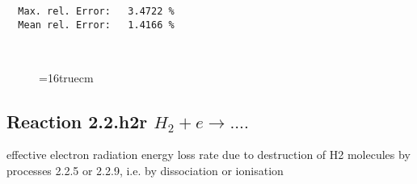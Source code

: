 \documentclass[12pt,dvipdfmx]{article}
\begin{document}
\begin{small}
\begin{verbatim}
  Max. rel. Error:   3.4722 %
  Mean rel. Error:   1.4166 %



\end{verbatim}\end{small}
\begin{figure} \label{2.2.h2c}
\epsfxsize=16truecm
\end{figure}
\newpage

\subsection{
  Reaction 2.2.h2r $H_2 + e \rightarrow  ....$
}

   effective electron radiation energy loss rate due to destruction of H2 molecules by
   processes 2.2.5 or 2.2.9, i.e. by dissociation or ionisation
\end{document}
